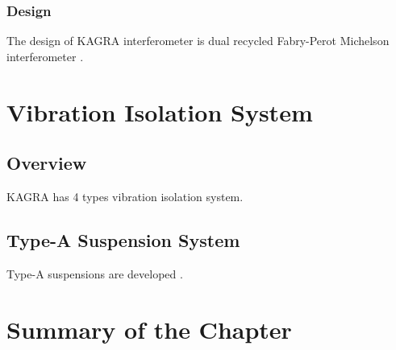 \subsubsection{Design}
The design of KAGRA interferometer is dual recycled Fabry-Perot Michelson interferometer \cite{aso2013interferometer}\cite{somiya2012detector}.

\section{Vibration Isolation System}
\subsection{Overview}
KAGRA has 4 types vibration isolation system. 
\subsection{Type-A Suspension System}
Type-A suspensions are developed \cite{Okutomi2019development}.

\section{Summary of the Chapter}
